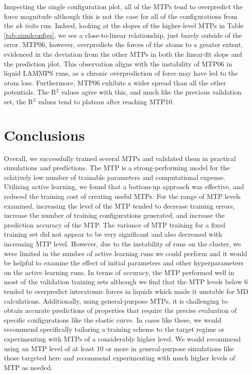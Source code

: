 \documentclass[9pt,twocolumn,twoside]{opticajnl}
\begin{document}
Inspecting the single configuration plot, all of the MTPs tend to overpredict the force magnitude although this is not the case for all of the configurations from the \textit{ab inito} run. Indeed, looking at the slopes of the higher-level MTPs in Table \ref{tab:aimdconfigs}, we see a close-to-linear relationship, just barely outside of the error.  MTP06, however, overpredicts the forces of the atoms to a greater extent, evidenced in the deviation from the other MTPs in both the linear-fit slope and the prediction plot. This observation aligns with the instability of MTP06 in liquid LAMMPS runs, as a chronic overprediction of force may have led to the atom loss. Furthermore, MTP06 exhibits a wider spread than all the other potentials. The R$^2$ values agree with this, and much like the previous validation set, the R$^2$ values tend to plateau after reaching MTP10.

\section{Conclusions}
Overall, we successfully trained several MTPs and validated them in practical simulations and predictions. The MTP is a strong-performing model for the relatively low number of trainable parameters and computational expense. Utilizing active learning, we found that a bottom-up approach was effective, and reduced the training cost of creating useful MTPs. For the range of MTP levels examined, increasing the level of the MTP tended to decrease training errors, increase the number of training configurations generated, and increase the prediction accuracy of the MTP. The variance of MTP training for a fixed training set did not appear to be very significant and also decreased with increasing MTP level. However, due to the instability of runs on the cluster, we were limited in the number of active learning runs we could perform and it would be helpful to examine the effect of initial parameters and other hyperparameters on the active learning runs. In terms of accuracy, the MTP performed well in most of the validation training sets although we find that the MTP levels below 6 tended to overpredict interatomic forces in liquids which made it unstable for MD calculations. Additionally, using general-purpose MTPs, it is challenging to obtain accurate predictions of properties that require the precise evaluation of specific configurations like the elastic curve. In cases like these, we would recommend specifically tailoring a training scheme to the target regime or experimenting with MTPs of a considerably higher level. We would recommend using an MTP level of at least 10 or more in general-purpose simulations like those targeted here and recommend experimenting with much higher levels of MTP as needed. 
\end{document}
